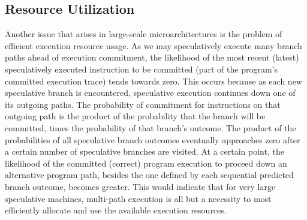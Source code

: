 \subsection{Resource Utilization}
%
Another issue that arises in large-scale microarchitectures is the
problem of efficient execution resource usage.
As we may speculatively execute many branch paths ahead of execution
commitment, the likelihood
of the most recent (latest) speculatively executed instruction to
be committed (part of the program's committed execution trace) tends
towards zero.  This occurs because as each new speculative branch is
encountered, speculative execution continues down one of its
outgoing paths.  The probability of commitment for instructions on 
that outgoing
path is the product of the probability that
the branch will be committed, times the probability of that branch's outcome.
The product of the probabilities of all speculative branch outcomes
eventually approaches zero after a certain
number of speculative branches are visited. 
At a certain point, the likelihood of the committed (correct)
program execution to proceed down an alternative program path,
besides the one defined by each sequential predicted branch outcome,
becomes greater.  This would indicate that for very large speculative
machines, multi-path execution is all but a necessity to most
efficiently allocate and use the available execution resources.
